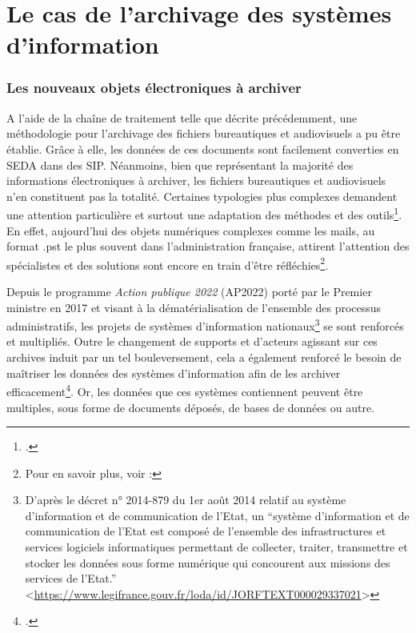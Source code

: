 \chapter{Le cas de l’archivage des systèmes d’information}

\subsection{Les nouveaux objets électroniques à archiver}
A l’aide de la chaîne de traitement telle que décrite précédemment, une méthodologie pour l’archivage des fichiers bureautiques et audiovisuels a pu être établie. Grâce à elle, les données de ces documents sont facilement converties en \gls{SEDA} dans des \gls{SIP}. Néanmoins, bien que représentant la majorité des informations électroniques à archiver, les fichiers bureautiques et audiovisuels n’en constituent pas la totalité. Certaines typologies plus complexes demandent une attention particulière et surtout une adaptation des méthodes et des outils\footcite[p.95]{dangio-barros_archivage_2013}. En effet, aujourd'hui des objets numériques complexes comme les mails, au format .pst le plus souvent dans l’administration française, attirent l’attention des spécialistes et des solutions sont encore en train d’être réfléchies\footnote{Pour en savoir plus, voir :\cite{programme_vitam_larchivage_2013}}.


Depuis le programme \textit{Action publique 2022} (AP2022) porté par le Premier ministre en 2017 et visant à la dématérialisation de l’ensemble des processus administratifs, les projets de systèmes d’information nationaux\footnote{D’après le décret n° 2014-879 du 1er août 2014 relatif au système d'information et de communication de l'Etat, un \enquote{système d'information et de communication de l'Etat est composé de l'ensemble des infrastructures et services logiciels informatiques permettant de collecter, traiter, transmettre et stocker les données sous forme numérique qui concourent aux missions des services de l'Etat.} <\href{https://www.legifrance.gouv.fr/loda/id/JORFTEXT000029337021}{https://www.legifrance.gouv.fr/loda/id/JORFTEXT000029337021}>} se sont renforcés et multipliés. Outre le changement de supports et d’acteurs agissant sur ces archives induit par un tel bouleversement, cela a également renforcé le besoin de maîtriser les données des systèmes d’information afin de les archiver efficacement\footcite{banat-berger_note_2023}. Or, les données que ces systèmes contiennent peuvent être multiples, sous forme de documents déposés, de bases de données ou autre. 


